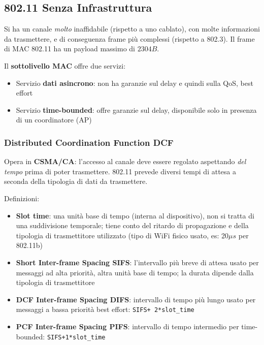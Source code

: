 \subsection{802.11 Senza Infrastruttura}

Si ha un canale \textit{molto} inaffidabile (rispetto a uno cablato), con molte informazioni da trasmettere, e di conseguenza frame più complessi (rispetto a 802.3). Il frame di MAC 802.11 ha un payload massimo di $2304B$.

Il \textbf{sottolivello MAC} offre due servizi: 
\begin{itemize}
	\item Servizio \textbf{dati asincrono}: non ha garanzie sul delay e quindi sulla QoS, best effort
	
    \item Servizio \textbf{time-bounded}: offre garanzie sul delay, disponibile solo in presenza di un coordinatore (AP)
\end{itemize}

\subsubsection{Distributed Coordination Function DCF}

Opera in \textbf{CSMA/CA}: l'accesso al canale deve essere regolato aspettando \textit{del tempo} prima di poter trasmettere. 802.11 prevede diversi tempi di attesa a seconda della tipologia di dati da trasmettere.

Definizioni:
\begin{itemize}
	\item \textbf{Slot time}: una unità base di tempo (interna al dispositivo), non si tratta di una suddivisione temporale; tiene conto del ritardo di propagazione e della tipologia di trasmettitore utilizzato (tipo di WiFi fisico usato, es: 20$\mu s$ per 802.11b)

	\item \textbf{Short Inter-frame Spacing SIFS}: l'intervallo più breve di attesa usato per messaggi ad alta priorità, altra unità base di tempo; la durata dipende dalla tipologia di trasmettitore

	\item \textbf{DCF Inter-frame Spacing DIFS}: intervallo di tempo più lungo usato per messaggi a bassa priorità best effort: \texttt{SIFS+ 2*slot\_time}

	\item \textbf{PCF Inter-frame Spacing PIFS}: intervallo di tempo intermedio per time-bounded: \texttt{SIFS+1*slot\_time}
\end{itemize}

